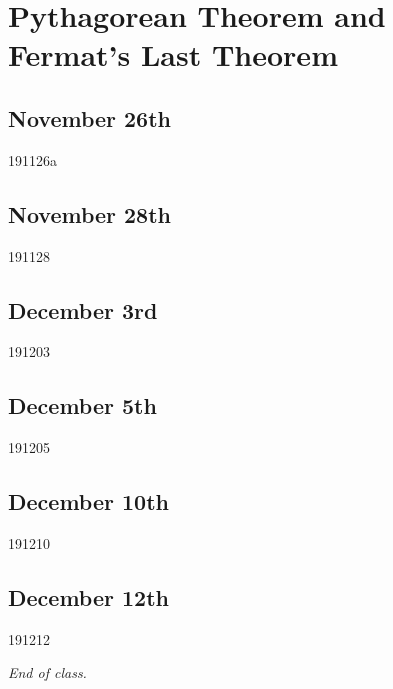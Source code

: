 \section{Pythagorean Theorem and Fermat's Last Theorem}
\subsection{November 26th}
{191126a}

\subsection{November 28th}
{191128}

\subsection{December 3rd}
{191203}

\subsection{December 5th}
{191205}

\subsection{December 10th}
{191210}

\subsection{December 12th}
{191212}

\noindent\makebox[\linewidth]{\rule{\linewidth}{0.4pt}}
\begin{flushright}
    \textit{End of class.}
\end{flushright}


